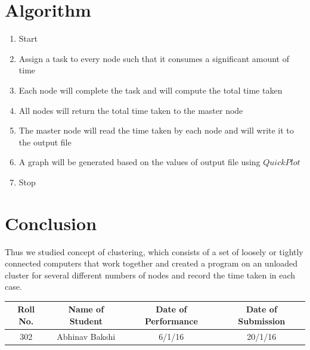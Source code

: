 \documentclass[a4paper,12pt]{article}
\begin{document}
\section{Algorithm}
\begin{enumerate}
	\item Start
    \item Assign a task to every node such that it consumes a significant amount of time
    \item Each node will complete the task and will compute the total time taken
    \item All nodes will return the total time taken to the master node
    \item The master node will read the time taken by each node and will write it to the output file
    \item A graph will be generated based on the values of output file using $QuickPlot$
    \item Stop
\end{enumerate}

\section{Conclusion}
 
 Thus we studied concept of clustering, which consists of a set of loosely or tightly connected computers that work together and created a program on an unloaded cluster for several different numbers of nodes and record the time taken in each case. 
 

\vspace{20px}
\begin{center}
	\begin{tabular}
		{|c|c|c|c|}\hline
		{\bf Roll No.}		&{\bf Name of Student}		&{\bf Date of Performance}  				&{\bf Date of Submission}  \\ \hline
		{302}	&	{Abhinav Bakshi }& {6/1/16}	&  {20/1/16}\\ \hline
	\end{tabular}\\ 
\end{center}
\end{document}
